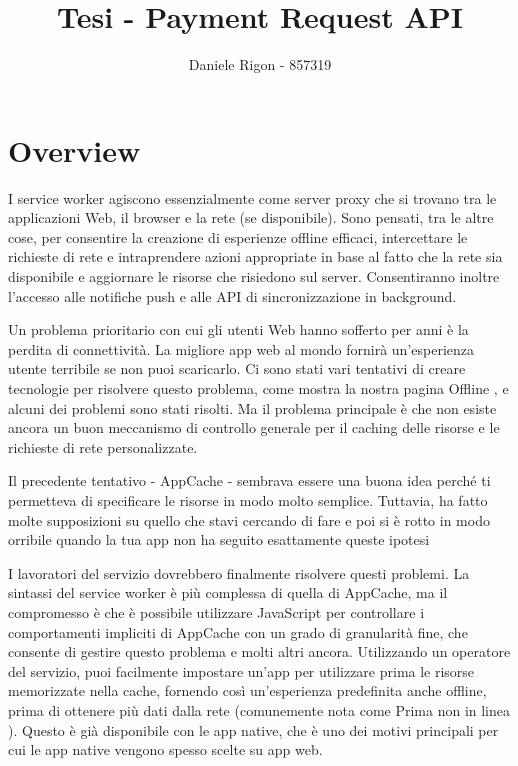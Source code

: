 \documentclass[italian]{article}
\author{
	Daniele Rigon - 857319 \\
}
\begin{document}
\title{Tesi - Payment Request API}
\maketitle

\tableofcontents
\pagebreak

\section{Overview}
I service worker agiscono essenzialmente come server proxy che si trovano tra le applicazioni Web, il browser e la rete (se disponibile). Sono pensati, tra le altre cose, per consentire la creazione di esperienze offline efficaci, intercettare le richieste di rete e intraprendere azioni appropriate in base al fatto che la rete sia disponibile e aggiornare le risorse che risiedono sul server. Consentiranno inoltre l'accesso alle notifiche push e alle API di sincronizzazione in background.

Un problema prioritario con cui gli utenti Web hanno sofferto per anni è la perdita di connettività. La migliore app web al mondo fornirà un'esperienza utente terribile se non puoi scaricarlo. Ci sono stati vari tentativi di creare tecnologie per risolvere questo problema, come mostra la nostra pagina Offline , e alcuni dei problemi sono stati risolti. Ma il problema principale è che non esiste ancora un buon meccanismo di controllo generale per il caching delle risorse e le richieste di rete personalizzate. 

Il precedente tentativo - AppCache - sembrava essere una buona idea perché ti permetteva di specificare le risorse in modo molto semplice. Tuttavia, ha fatto molte supposizioni su quello che stavi cercando di fare e poi si è rotto in modo orribile quando la tua app non ha seguito esattamente queste ipotesi

I lavoratori del servizio dovrebbero finalmente risolvere questi problemi. La sintassi del service worker è più complessa di quella di AppCache, ma il compromesso è che è possibile utilizzare JavaScript per controllare i comportamenti impliciti di AppCache con un grado di granularità fine, che consente di gestire questo problema e molti altri ancora. Utilizzando un operatore del servizio, puoi facilmente impostare un'app per utilizzare prima le risorse memorizzate nella cache, fornendo così un'esperienza predefinita anche offline, prima di ottenere più dati dalla rete (comunemente nota come Prima non in linea ). Questo è già disponibile con le app native, che è uno dei motivi principali per cui le app native vengono spesso scelte su app web.
\end{document}

